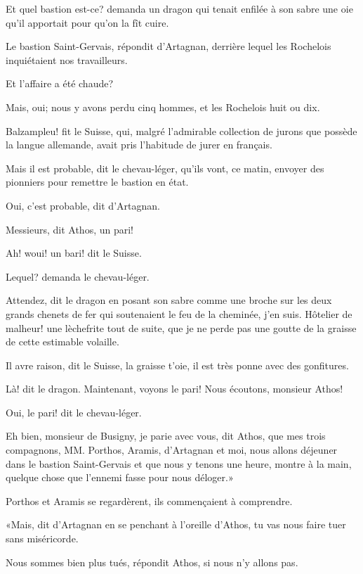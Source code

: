 \speak  Et quel bastion est-ce? demanda un dragon qui tenait enfilée à son sabre une oie qu'il apportait pour qu'on la fît cuire. 

\speak  Le bastion Saint-Gervais, répondit d'Artagnan, derrière lequel les Rochelois inquiétaient nos travailleurs. 

\speak  Et l'affaire a été chaude? 

\speak  Mais, oui; nous y avons perdu cinq hommes, et les Rochelois huit ou dix. 

\speak  Balzampleu! fit le Suisse, qui, malgré l'admirable collection de jurons que possède la langue allemande, avait pris l'habitude de jurer en français. 

\speak  Mais il est probable, dit le chevau-léger, qu'ils vont, ce matin, envoyer des pionniers pour remettre le bastion en état. 

\speak  Oui, c'est probable, dit d'Artagnan. 

\speak  Messieurs, dit Athos, un pari! 

\speak  Ah! woui! un bari! dit le Suisse. 

\speak  Lequel? demanda le chevau-léger. 

\speak  Attendez, dit le dragon en posant son sabre comme une broche sur les deux grands chenets de fer qui soutenaient le feu de la cheminée, j'en suis. Hôtelier de malheur! une lèchefrite tout de suite, que je ne perde pas une goutte de la graisse de cette estimable volaille. 

\speak  Il avre raison, dit le Suisse, la graisse t'oie, il est très ponne avec des gonfitures. 

\speak  Là! dit le dragon. Maintenant, voyons le pari! Nous écoutons, monsieur Athos! 

\speak  Oui, le pari! dit le chevau-léger. 

\speak  Eh bien, monsieur de Busigny, je parie avec vous, dit Athos, que mes trois compagnons, MM. Porthos, Aramis, d'Artagnan et moi, nous allons déjeuner dans le bastion Saint-Gervais et que nous y tenons une heure, montre à la main, quelque chose que l'ennemi fasse pour nous déloger.» 

Porthos et Aramis se regardèrent, ils commençaient à comprendre. 

«Mais, dit d'Artagnan en se penchant à l'oreille d'Athos, tu vas nous faire tuer sans miséricorde. 

\speak  Nous sommes bien plus tués, répondit Athos, si nous n'y allons pas. 

